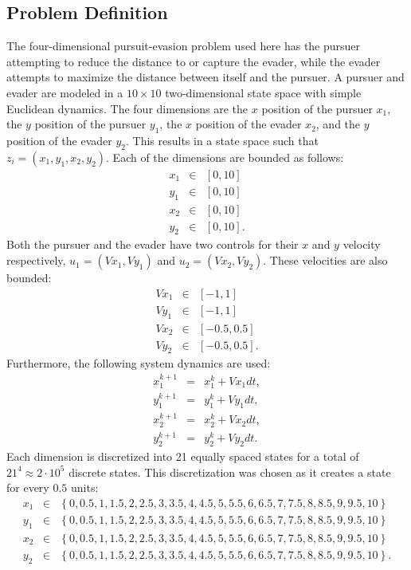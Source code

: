 \subsection{Problem Definition}
The four-dimensional pursuit-evasion problem used here has the pursuer attempting to reduce the distance to or capture the evader, while the evader attempts to maximize the distance between itself and the pursuer. A pursuer and evader are modeled in a $10 \times 10$ two-dimensional  state space with simple Euclidean dynamics. The four dimensions are the $x$ position of the pursuer $x_1$, the $y$ position of the pursuer $y_1$, the $x$ position of the evader $x_2$, and the $y$ position of the evader $y_2$. This results in a state space such that $z_i = (x_1,y_1,x_2,y_2)$. Each of the dimensions are bounded as follows:
\begin{eqnarray*}
x_1 & \in & [0,10]\\
y_1 & \in & [0,10]\\
x_2 & \in & [0,10]\\
y_2 & \in & [0,10].
\end{eqnarray*} 
Both the pursuer and the evader have two controls for their $x$ and $y$ velocity respectively, $u_1 = (Vx_1,Vy_1)$ and $u_2 = (Vx_2,Vy_2)$. These velocities are also bounded:
\begin{eqnarray*}
Vx_1 & \in & [-1,1]\\
Vy_1 & \in & [-1,1]\\
Vx_2 & \in & [-0.5,0.5]\\
Vy_2 & \in & [-0.5,0.5].
\end{eqnarray*} 
Furthermore, the following system dynamics are used:
\begin{eqnarray}\label{eqns1}
x_1^{k+1} & = & x_1^k +Vx_1dt,\\
y_1^{k+1} & = & y_1^k +Vy_1dt,\\
x_2^{k+1} & = & x_2^k +Vx_2dt,\\
y^{k+1}_2 & = & y_2^k +Vy_2dt.
\end{eqnarray}
Each dimension is discretized into 21 equally spaced states for a total of $21^4 \approx 2\cdot10^5$ discrete states. This discretization was chosen as it creates a state for every $0.5$ units:
\begin{eqnarray*}
x_1 & \in & \left\{0,0.5,1,1.5,2,2.5,3,3.5,4,4.5,5,5.5,6,6.5,7,7.5,8,8.5,9,9.5,10\right\}\\
y_1 & \in & \left\{0,0.5,1,1.5,2,2.5,3,3.5,4,4.5,5,5.5,6,6.5,7,7.5,8,8.5,9,9.5,10\right\}\\
x_2 & \in & \left\{0,0.5,1,1.5,2,2.5,3,3.5,4,4.5,5,5.5,6,6.5,7,7.5,8,8.5,9,9.5,10\right\}\\
y_2 & \in & \left\{0,0.5,1,1.5,2,2.5,3,3.5,4,4.5,5,5.5,6,6.5,7,7.5,8,8.5,9,9.5,10\right\}.
\end{eqnarray*} 
 
